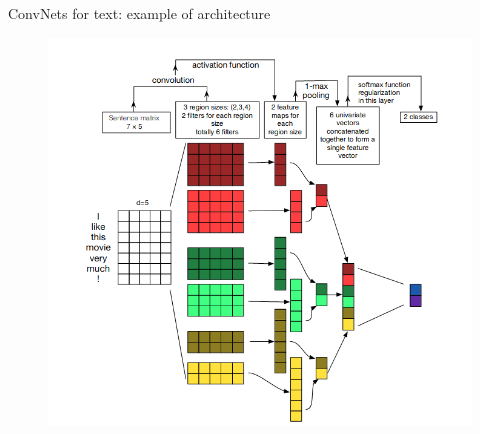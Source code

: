 \documentclass{beamer}
\begin{document}
\begin{frame}{ConvNets for text: example of architecture}
\begin{figure}
    \centering
    \includegraphics[scale=0.35]{images/cnnstruct.png}
\end{figure}    
\end{frame}
\end{document}
